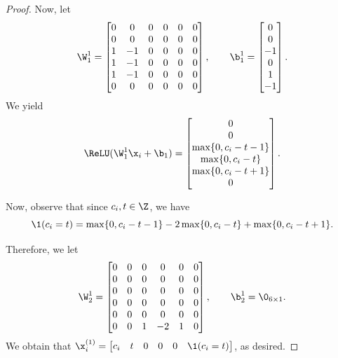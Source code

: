 \begin{proof}
    Now, let 
    \begin{equation*}
        \W_1^1 = \begin{bmatrix}
            0 &0 &0 &0 &0 &0 \\
            0 &0 &0 &0 &0 &0 \\ 
            1 &-1 &0 &0 &0 &0 \\
            1 &-1 &0 &0 &0 &0 \\
            1 &-1 &0 &0 &0 &0 \\
            0 &0 &0 &0 &0 &0
        \end{bmatrix}, \qquad \b_1^1 = \begin{bmatrix}
            0 \\0 \\-1 \\0 \\1 \\-1
        \end{bmatrix}. 
    \end{equation*}
    We yield 
    \begin{equation*}
        \ReLU(\W_1^1 \x_i + \b_1) = \begin{bmatrix}
            0 \\0 \\\max\{0, c_i - t-1\} \\\max\{0, c_i - t\} \\\max\{0, c_i - t +1\} \\ 0 
        \end{bmatrix}.
    \end{equation*}

    Now, observe that since $c_i, t \in \Z$, we have 
    \begin{equation*}
        \1(c_i = t) = \max\{0, c_i - t - 1\} - 2\max\{0, c_i - t\} + \max\{0, c_i - t+1\}.
    \end{equation*}
    
    Therefore, we let 
    \begin{equation*}
        \W_2^1 = \begin{bmatrix}
            0 & 0 &0 &0 &0 &0 \\
            0 & 0 &0 &0 &0 &0 \\
            0 & 0 &0 &0 &0 &0  \\
            0 & 0 &0 &0 &0 &0 \\
            0 & 0 &0 &0 &0 &0 \\
            0 &0 &1 &-2 &1 &0
        \end{bmatrix}, \qquad \b_2^1 = \0_{6 \times 1}.
    \end{equation*}
    We obtain that $\x_i^{(1)} = \begin{bmatrix}
        c_i &t &0 &0 &0 &\1(c_i = t)
    \end{bmatrix}$, as desired. 
    
\end{proof}

